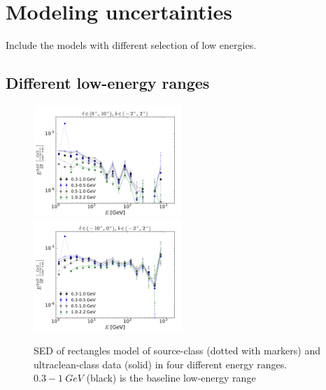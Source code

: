 \section{Modeling uncertainties}

Include the models with different selection of low energies.
\subsection{Different low-energy ranges}

\begin{figure}[h]
\includegraphics[width=0.5\textwidth]{plots/SED_different_lowE_ranges_boxes_l=5_b=0.pdf}
\includegraphics[width=0.5\textwidth]{plots/SED_different_lowE_ranges_boxes_l=-5_b=0.pdf}
  	\caption{SED of rectangles model of source-class (dotted with markers) and ultraclean-class data (solid) in four different energy ranges. $0.3 - \SI{1}{GeV}$ (black) is the baseline low-energy range}
  	\label{fig:syst_models}
\end{figure}